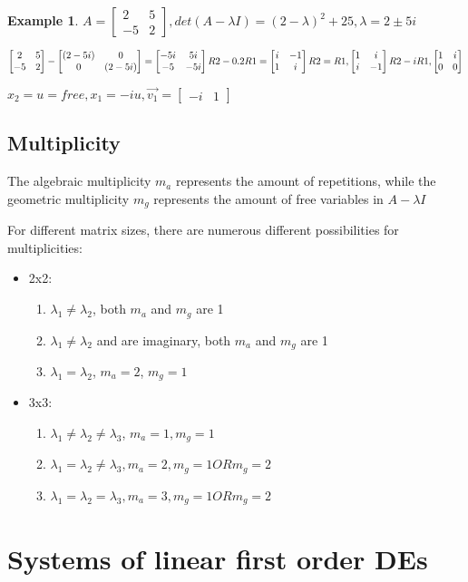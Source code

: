 \documentclass{article}
\newtheorem{example}{Example}
\begin{document}
\begin{example}
	$A=\begin{bmatrix}2&5\\-5&2\end{bmatrix}, det(A-\lambda I)=(2-\lambda)^2+25, \lambda=2\pm5i$

	$\begin{bmatrix}2&5\\-5&2\end{bmatrix}-\begin{bmatrix}(2-5i)&0\\0&(2-5i)\end{bmatrix}=
		\begin{bmatrix}-5i&5i\\-5&-5i\end{bmatrix}\\
		R2-0.2R1=\begin{bmatrix}i&-1\\1&i\end{bmatrix}
		R2=R1, \begin{bmatrix}1&i\\i&-1\end{bmatrix}
		R2-iR1, \begin{bmatrix}1&i\\0&0\end{bmatrix}$

		$x_2=u=free, x_1=-iu, \vec{v_1}=\begin{bmatrix}-i&1\end{bmatrix}$
\end{example}

\subsection{Multiplicity}

The algebraic multiplicity $m_a$ represents the amount of repetitions, while the geometric multiplicity $m_g$ represents the amount of
free variables in $A-\lambda I$

For different matrix sizes, there are numerous different possibilities for multiplicities:
\begin{itemize}
	\item 2x2:
	\begin{enumerate}
		\item $\lambda_1\neq\lambda_2$,
			both $m_a$ and $m_g$ are 1
		\item $\lambda_1\neq\lambda_2$ and are imaginary, both $m_a$ and $m_g$ are 1
		\item $\lambda_1=\lambda_2$, $m_a=2$, $m_g=1$
	\end{enumerate}

\item 3x3:
	\begin{enumerate}
		\item $\lambda_1\neq\lambda_2\neq\lambda_3$, $m_a=1, m_g=1$
		\item $\lambda_1=\lambda_2\neq\lambda_3, m_a=2, m_g=1 OR m_g=2$
		\item $\lambda_1=\lambda_2=\lambda_3, m_a=3, m_g=1 OR m_g=2$
	\end{enumerate}
\end{itemize}

\section{Systems of linear first order DEs}
\end{document}
